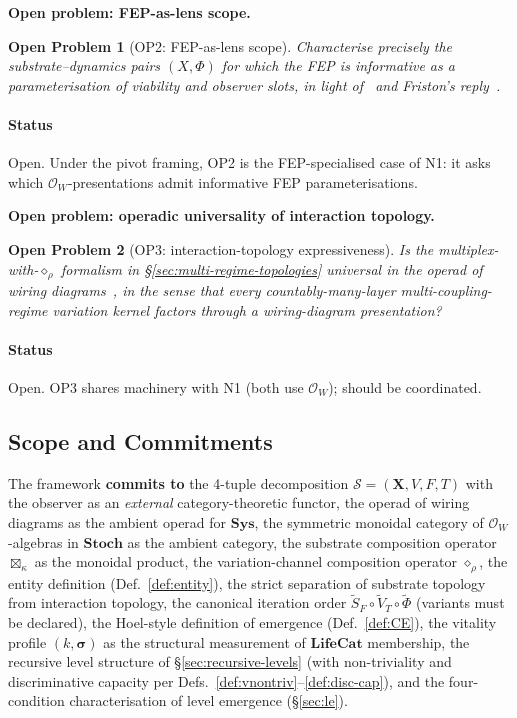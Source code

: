 \documentclass[journal]{IEEEtran}
\theoremstyle{plain}
\theoremstyle{definition}
\theoremstyle{plain}
\newtheorem*{openproblemstar}{Open Problem}
\newenvironment{namedopenproblem}[1]{%
  \begin{openproblemstar}[#1]%
}{\end{openproblemstar}}
\newcounter{topic}[subsection]
\newcommand{\topic}[1]{%
  \refstepcounter{topic}%
  \par\smallskip\noindent\textbf{#1.}\ }
\newcommand{\X}{\mathbf{X}}
\begin{document}
\topic{Open problem: FEP-as-lens scope}

\begin{namedopenproblem}{OP2: FEP-as-lens scope}
Characterise precisely the substrate--dynamics pairs $(X, \Phi)$ for
which the FEP is informative as a parameterisation of viability and
observer slots, in light
of~\cite{aguilera2022particular,biehl2021critique} and Friston's
reply~\cite{friston2022reply}.
\end{namedopenproblem}

\paragraph{Status} Open. Under the pivot framing, OP2 is the
FEP-specialised case of N1: it asks which
$\mathcal{O}_W$-presentations admit informative FEP parameterisations.

\topic{Open problem: operadic universality of interaction topology}

\begin{namedopenproblem}{OP3: interaction-topology expressiveness}
Is the multiplex-with-$\diamond_\rho$ formalism in
\S\ref{sec:multi-regime-topologies} universal in the operad of wiring
diagrams~\cite{vagner2015algebras}, in the sense that every
countably-many-layer multi-coupling-regime variation kernel factors
through a wiring-diagram presentation?
\end{namedopenproblem}

\paragraph{Status} Open. OP3 shares machinery with N1 (both use
$\mathcal{O}_W$); should be coordinated.

\subsection{Scope and Commitments}\label{sec:scope}

The framework \textbf{commits to} the 4-tuple decomposition
$\mathcal{S} = (\X, V, F, T)$ with the observer as an \emph{external}
category-theoretic functor, the operad of wiring diagrams as the
ambient operad for $\mathbf{Sys}$, the symmetric monoidal category of
$\mathcal{O}_W$-algebras in $\mathbf{Stoch}$ as the ambient category,
the substrate composition operator $\boxtimes_\kappa$ as the monoidal
product, the variation-channel composition operator $\diamond_\rho$,
the entity definition (Def.~\ref{def:entity}), the strict separation
of substrate topology from interaction topology, the canonical
iteration order $\widetilde S_F \circ \widetilde V_T \circ
\widetilde\Phi$ (variants must be declared), the Hoel-style definition
of emergence (Def.~\ref{def:CE}), the vitality profile
$(k, \boldsymbol{\sigma})$ as the structural measurement of
$\mathbf{LifeCat}$ membership, the recursive level structure of
\S\ref{sec:recursive-levels} (with non-triviality and discriminative
capacity per Defs.~\ref{def:vnontriv}--\ref{def:disc-cap}), and the
four-condition characterisation of level emergence (\S\ref{sec:le}).
\end{document}
